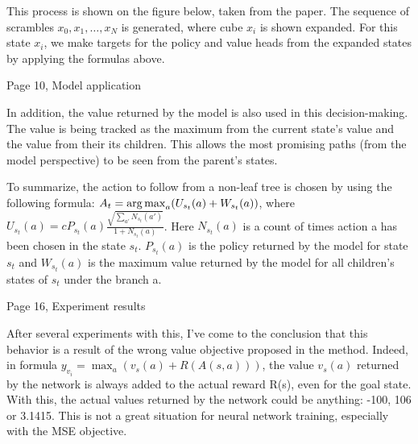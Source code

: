 This process is shown on the figure below, taken from the paper. The sequence of scrambles \begin{math}x_0,x_1,\ldots,x_N\end{math} is generated, where cube \begin{math}x_i\end{math} is shown expanded. For this state \begin{math}x_i\end{math}, we make targets for the policy and value heads from the expanded states by applying the formulas above.

Page 10, Model application

In addition, the value returned by the model is also used in this decision-making. The value is being tracked as the maximum from the current state's value and the value from their its children. This allows the most promising paths (from the model perspective) to be seen from the parent's states.

To summarize, the action to follow from a non-leaf tree is chosen by using the following formula:
\begin{math}A_t = \operatorname*{arg\,max}_a (U_{s_t}(a) + W_{s_t}(a))\end{math}, where \begin{math}U_{s_t}(a) = c P_{s_t}(a) \frac{\sqrt{\sum_{a'}N_{s_t}(a')}}{1 + N_{s_t}(a)}\end{math}.
Here \begin{math}N_{s_t}(a)\end{math} is a count of times action a has been chosen in the state \begin{math}s_t\end{math}. \begin{math}P_{s_t}(a)\end{math} is the policy returned by the model for state \begin{math}s_t\end{math} and \begin{math}W_{s_t}(a)\end{math} is the maximum value returned by the model for all children's states of \begin{math}s_t\end{math} under the branch a.


Page 16, Experiment results

After several experiments with this, I've come to the conclusion that this behavior is a result of the wrong value objective proposed in the method. Indeed, in formula \begin{math}y_{v_i} = \max_a (v_s(a) + R(A(s, a)))\end{math}, the value \begin{math}v_s(a)\end{math} returned by the network is always added to the actual reward R(s), even for the goal state. With this, the actual values returned by the network could be anything: -100, 106 or 3.1415. This is not a great situation for neural network training, especially with the MSE objective.

